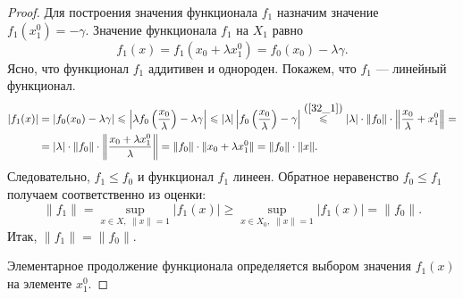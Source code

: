 \documentclass[12pt,a4paper,titlepage,oneside]{book}
\theoremstyle{definition}
\theoremstyle{plain}
\theoremstyle{break}
\theoremstyle{remark}
\theoremstyle{remark}
\theoremstyle{remark}
\theoremstyle{remark}
\theoremstyle{plain}
\theoremstyle{plain}
\begin{document}
\begin{proof}
Для построения значения функционала $f_1$ назначим значение $f_1(x_1^0)=-\gamma$. Значение функционала $f_1$ на $X_1$ равно
$$ f_1(x)=f_1(x_0+ \lambda x_1^0)=f_0(x_0)-\lambda \gamma.$$
Ясно, что функционал $f_1$ аддитивен и однороден. Покажем, что $f_1$ --- линейный функционал.
\begin{align*}
\vert f_1(x) \vert &= \vert f_0(x_0)-\lambda \gamma \vert  \leqslant \left \vert \lambda f_0\left(\frac{x_0}{\lambda}\right)-\lambda \gamma\right \vert  \leqslant
 \vert \lambda \vert  \left \vert f_0\left(\frac{x_0}{\lambda}\right)- \gamma\right \vert  \overset{\mbox{(\ref{32_1})}}{\leqslant}  \vert \lambda \vert \cdot \lVert f_0 \rVert \cdot \left \lVert \frac{x_0}{\lambda} + x_1^0 \right \rVert =\\
&= \lvert \lambda \rvert \cdot \lVert f_0 \rVert \cdot \left \lVert \frac{x_0+\lambda x_1^0}{\lambda} \right \rVert = \lVert f_0 \rVert \cdot  \lVert x_0+\lambda x_1^0 \rVert = \lVert f_0 \rVert \cdot  \lVert x \rVert.
\end{align*}
Следовательно, $f_1 \leqslant f_0$ и функционал $f_1$ линеен.
Обратное неравенство $f_0 \leqslant f_1$ получаем соответственно из оценки:
$$ \lVert f_1 \rVert=\underset{x \in X, \; \lVert x \rVert = 1 }{\sup}  \vert f_1(x) \vert  \geqslant \underset{x \in X_0, \; \lVert x \rVert = 1 }{\sup}  \vert f_1(x) \vert =\lVert f_0 \rVert.$$
Итак, $\lVert f_1 \rVert=\lVert f_0 \rVert$.

Элементарное продолжение функционала определяется выбором значения $f_1(x)$ на элементе $x_1^0$.
\end{proof}
\end{document}
